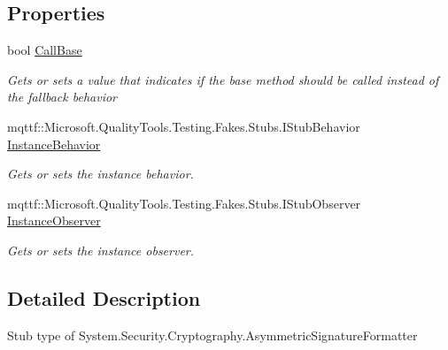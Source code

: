 \subsection*{Properties}
\begin{DoxyCompactItemize}
\item 
bool \hyperlink{class_system_1_1_security_1_1_cryptography_1_1_fakes_1_1_stub_asymmetric_signature_formatter_adbbc0d9bd313b9e93ae4636dfee09746}{Call\-Base}
\begin{DoxyCompactList}\small\item\em Gets or sets a value that indicates if the base method should be called instead of the fallback behavior\end{DoxyCompactList}\item 
mqttf\-::\-Microsoft.\-Quality\-Tools.\-Testing.\-Fakes.\-Stubs.\-I\-Stub\-Behavior \hyperlink{class_system_1_1_security_1_1_cryptography_1_1_fakes_1_1_stub_asymmetric_signature_formatter_a85e90791c41bf5522e731c95878e1e1d}{Instance\-Behavior}
\begin{DoxyCompactList}\small\item\em Gets or sets the instance behavior.\end{DoxyCompactList}\item 
mqttf\-::\-Microsoft.\-Quality\-Tools.\-Testing.\-Fakes.\-Stubs.\-I\-Stub\-Observer \hyperlink{class_system_1_1_security_1_1_cryptography_1_1_fakes_1_1_stub_asymmetric_signature_formatter_a0472c1d8277ee3a9638205cce643bbc7}{Instance\-Observer}
\begin{DoxyCompactList}\small\item\em Gets or sets the instance observer.\end{DoxyCompactList}\end{DoxyCompactItemize}


\subsection{Detailed Description}
Stub type of System.\-Security.\-Cryptography.\-Asymmetric\-Signature\-Formatter



